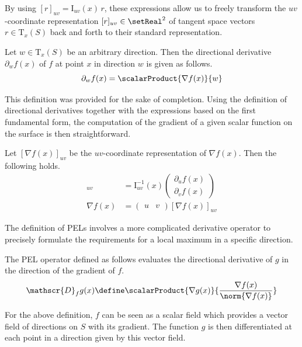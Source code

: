 \documentclass[9pt,fleqn,twoside,twocolumn]{stdglobal}
\begin{document}
  \noindent
  By using $[r]_{uv} = \mathrm{I}_{uv}(x)\, r$, these expressions allow us to freely transform the $uv$-coordinate representation $[r]_{uv}\in\setReal^2$ of tangent space vectors $r\in\mathrm{T}_x(S)$ back and forth to their standard representation.

  \begin{definition*}
    Let $w\in\mathrm{T}_x(S)$ be an arbitrary direction.
    Then the directional derivative $\partial_w f(x)$ of $f$ at point $x$ in direction $w$ is given as follows.
    \[
      \partial_w f(x) = \scalarProduct{\nabla f(x)}{w}
    \]
  \end{definition*}

  \noindent
  This definition was provided for the sake of completion.
  Using the definition of directional derivatives together with the expressions based on the first fundamental form, the computation of the gradient of a given scalar function on the surface is then straightforward.

  \begin{definition*}[(Gradient)]
    Let $[\nabla f(x)]_{uv}$ be the $uv$-coordinate representation of $\nabla f(x)$.
    Then the following holds.
    \begin{align*}
      [\nabla f(x)]_{uv} &= \mathrm{I}^{-1}_{uv}(x)
      \begin{pmatrix}
        \partial_u f(x) \\
        \partial_v f(x)
      \end{pmatrix} \\
      \nabla f(x) &=
      \begin{pmatrix}
        u & v
      \end{pmatrix}
      [\nabla f(x)]_{uv}
    \end{align*}
  \end{definition*}

  \noindent
  The definition of PELs involves a more complicated derivative operator to precisely formulate the requirements for a local maximum in a specific direction.

  \begin{definition*}
    The PEL operator defined as follows evaluates the directional derivative of $g$ in the direction of the gradient of $f$.
    \[
      \mathscr{D}_f g(x) \define \scalarProduct{\nabla g(x)}{\frac{\nabla f(x)}{\norm{\nabla f(x)}}}
    \]
  \end{definition*}

  \noindent
  For the above definition, $f$ can be seen as a scalar field which provides a vector field of directions on $S$ with its gradient.
  The function $g$ is then differentiated at each point in a direction given by this vector field.
\end{document}

